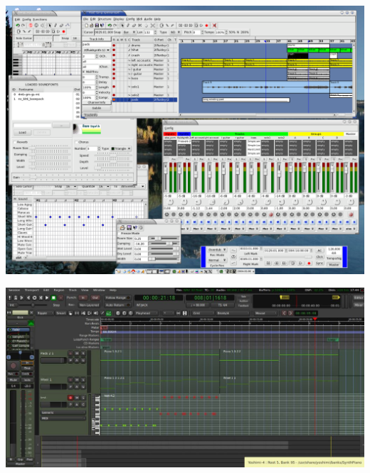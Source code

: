 \documentclass{beamer}
\begin{document}
\begin{frame}
  \begin{center}
    \includegraphics[scale=0.2]{images/muse_desktop.png}
  \end{center}
\end{frame}

\begin{frame}
  \begin{center}
    \includegraphics[scale=0.33]{images/Screenshot-from-2017-08-01-17-44-03-1024x515.jpg}
  \end{center}
\end{frame}
\end{document}
